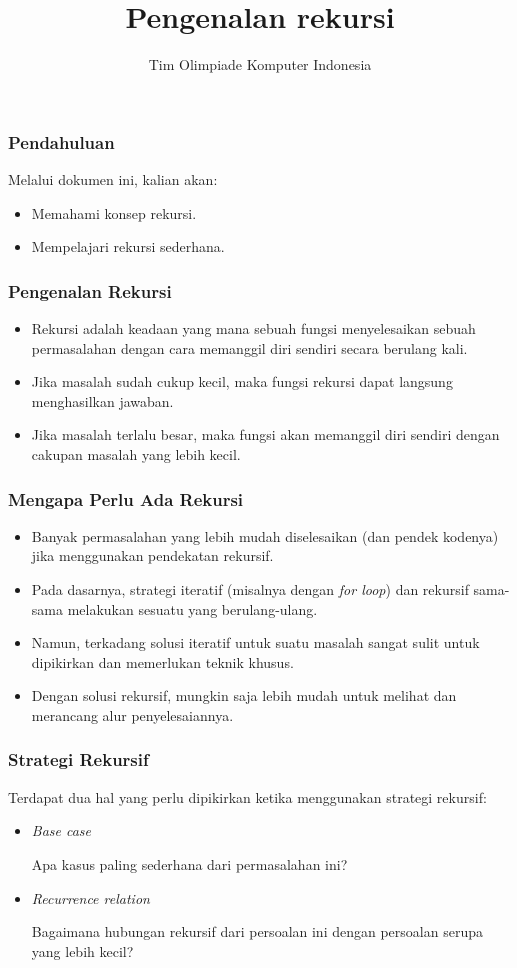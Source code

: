 

\title{Pengenalan rekursi}
\author{Tim Olimpiade Komputer Indonesia}
\date{}



\begin{frame}
\titlepage
\end{frame}

\begin{frame}
\frametitle{Pendahuluan}
Melalui dokumen ini, kalian akan:
\begin{itemize}
  \item Memahami konsep rekursi.
  \item Mempelajari rekursi sederhana.
\end{itemize}
\end{frame}

\begin{frame}
\frametitle{Pengenalan Rekursi}
\begin{itemize}
  \item Rekursi adalah keadaan yang mana sebuah fungsi menyelesaikan sebuah permasalahan dengan cara memanggil diri sendiri secara berulang kali.
  \item Jika masalah sudah cukup kecil, maka fungsi rekursi dapat langsung menghasilkan jawaban.
  \item Jika masalah terlalu besar, maka fungsi akan memanggil diri sendiri dengan cakupan masalah yang lebih kecil.
\end{itemize}
\end{frame}

\begin{frame}
\frametitle{Mengapa Perlu Ada Rekursi}
\begin{itemize}
  \item Banyak permasalahan yang lebih mudah diselesaikan (dan pendek kodenya) jika menggunakan pendekatan rekursif.
  \item Pada dasarnya, strategi iteratif (misalnya dengan \textit{for loop}) dan rekursif sama-sama melakukan sesuatu yang berulang-ulang. 
  \item Namun, terkadang solusi iteratif  untuk suatu masalah sangat sulit untuk dipikirkan dan memerlukan teknik khusus.
  \item Dengan solusi rekursif, mungkin saja lebih mudah untuk melihat dan merancang alur penyelesaiannya.
\end{itemize}
\end{frame}

\begin{frame}
\frametitle{Strategi Rekursif}
Terdapat dua hal yang perlu dipikirkan ketika menggunakan strategi rekursif:
\begin{itemize}
  \item \textit{Base case}
  
  Apa kasus paling sederhana dari permasalahan ini?
  
  \item \textit{Recurrence relation}
  
  Bagaimana hubungan rekursif dari persoalan ini dengan persoalan serupa yang lebih kecil?
\end{itemize}
\end{frame}

